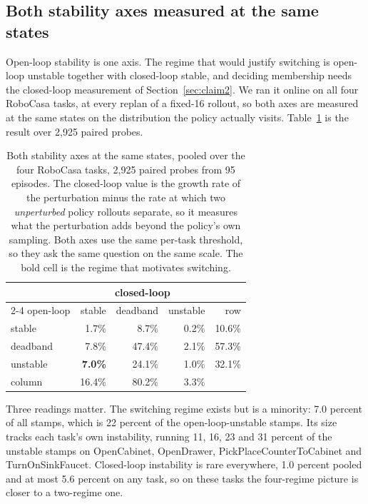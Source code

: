 \subsection{Both stability axes measured at the same states}
\label{sec:threebythree}

Open-loop stability is one axis. The regime that would justify switching is
open-loop unstable together with closed-loop stable, and deciding membership
needs the closed-loop measurement of Section~\ref{sec:claim2}. We ran it
online on all four RoboCasa tasks, at every replan of a fixed-16 rollout, so
both axes are measured at the same states on the distribution the policy
actually visits. Table~\ref{tab:threebythree} is the result over 2{,}925
paired probes.

\begin{table}[t]
\centering
\small
\begin{tabular}{lrrrr}
\toprule
& \multicolumn{3}{c}{closed-loop} & \\
\cmidrule(lr){2-4}
open-loop & stable & deadband & unstable & row \\
\midrule
stable & 1.7\% & 8.7\% & 0.2\% & 10.6\% \\
deadband & 7.8\% & 47.4\% & 2.1\% & 57.3\% \\
unstable & \textbf{7.0\%} & 24.1\% & 1.0\% & 32.1\% \\
\midrule
column & 16.4\% & 80.2\% & 3.3\% & \\
\bottomrule
\end{tabular}
\caption{Both stability axes at the same states, pooled over the four
RoboCasa tasks, 2{,}925 paired probes from 95 episodes. The closed-loop value
is the growth rate of the perturbation minus the rate at which two
\emph{unperturbed} policy rollouts separate, so it measures what the
perturbation adds beyond the policy's own sampling. Both axes use the same
per-task threshold, so they ask the same question on the same scale. The bold
cell is the regime that motivates switching.}
\label{tab:threebythree}
\end{table}

Three readings matter. The switching regime exists but is a minority: 7.0
percent of all stamps, which is 22 percent of the open-loop-unstable stamps.
Its size tracks each task's own instability, running 11, 16, 23 and 31 percent
of the unstable stamps on OpenCabinet, OpenDrawer,
PickPlaceCounterToCabinet and TurnOnSinkFaucet. Closed-loop instability is
rare everywhere, 1.0 percent pooled and at most 5.6 percent on any task, so on
these tasks the four-regime picture is closer to a two-regime one.

